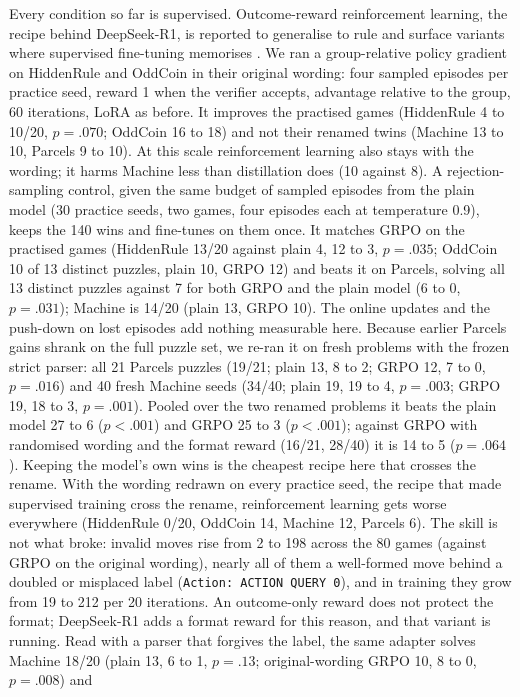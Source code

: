 \documentclass[11pt]{article}
\begin{document}
Every condition so far is supervised. Outcome-reward reinforcement learning, the recipe behind DeepSeek-R1, is
reported to generalise to rule and surface variants where supervised fine-tuning memorises \citep{chu2025}. We ran
a group-relative policy gradient on HiddenRule and OddCoin in their original wording: four sampled episodes per
practice seed, reward 1 when the verifier accepts, advantage relative to the group, 60 iterations, LoRA as before.
It improves the practised games (HiddenRule 4 to 10/20, $p=.070$; OddCoin 16 to 18) and not their renamed twins
(Machine 13 to 10, Parcels 9 to 10). At this scale reinforcement learning also stays with the wording; it harms
Machine less than distillation does (10 against 8). A rejection-sampling control, given the same budget of sampled
episodes from the plain model (30 practice seeds, two games, four episodes each at temperature 0.9), keeps the 140
wins and fine-tunes on them once. It matches GRPO on the practised games (HiddenRule 13/20 against plain 4, 12 to 3,
$p=.035$; OddCoin 10 of 13 distinct puzzles, plain 10, GRPO 12) and beats it on Parcels, solving all 13 distinct
puzzles against 7 for both GRPO and the plain model (6 to 0, $p=.031$); Machine is 14/20 (plain 13, GRPO 10). The
online updates and the push-down on lost episodes add nothing measurable here. Because earlier Parcels gains shrank
on the full puzzle set, we re-ran it on fresh problems with the frozen strict parser: all 21 Parcels puzzles
(19/21; plain 13, 8 to 2; GRPO 12, 7 to 0, $p=.016$) and 40 fresh Machine seeds (34/40; plain 19, 19 to 4,
$p=.003$; GRPO 19, 18 to 3, $p=.001$). Pooled over the two renamed problems it beats the plain model 27 to 6
($p<.001$) and GRPO 25 to 3 ($p<.001$); against GRPO with randomised wording and the format reward (16/21, 28/40)
it is 14 to 5 ($p=.064$). Keeping the model's own wins is the cheapest recipe here that crosses the rename. With the wording redrawn on every practice seed, the recipe that
made supervised training cross the rename, reinforcement learning gets worse everywhere (HiddenRule 0/20, OddCoin
14, Machine 12, Parcels 6). The skill is not what broke: invalid moves rise from 2 to 198 across the 80 games (against GRPO on the original wording),
nearly all of them a well-formed move behind a doubled or misplaced label (\texttt{Action: ACTION QUERY 0}), and in
training they grow from 19 to 212 per 20 iterations. An outcome-only reward does not protect the format; DeepSeek-R1
adds a format reward for this reason, and that variant is running. Read with a parser that forgives the label, the
same adapter solves Machine 18/20 (plain 13, 6 to 1, $p=.13$; original-wording GRPO 10, 8 to 0, $p=.008$) and
\end{document}
